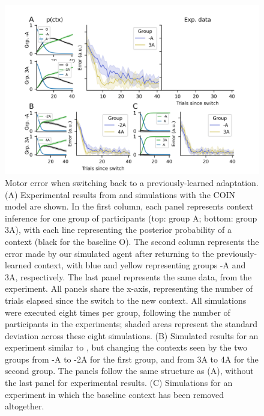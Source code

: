 \documentclass[a4paper,doc,floatsintext,natbib]{apa6}%
\begin{document}
\begin{figure}
\centering
\includegraphics{./figures/figure_3.png}
\caption{Motor error when switching back to a previously-learned adaptation. (A) Experimental results from \cite{Davidson_Scaling_2004} and simulations with the COIN model are shown. In the first column, each panel represents context inference for one group of participants (top: group A; bottom: group 3A), with each line representing the posterior probability of a context (black for the baseline O). The second column represents the error made by our simulated agent after returning to the previously-learned context, with blue and yellow representing groups -A and 3A, respectively. The last panel represents the same data, from the \cite{Davidson_Scaling_2004} experiment. All panels share the x-axis, representing the number of trials elapsed since the switch to the new context. All simulations were executed eight times per group, following the number of participants in the experiments; shaded areas represent the standard deviation across these eight simulations. (B) Simulated results for an experiment similar to \cite{Davidson_Scaling_2004}, but changing the contexts seen by the two groups from -A to -2A for the first group, and from 3A to 4A for the second group. The panels follow the same structure as (A), without the last panel for experimental results. (C) Simulations for an experiment in which the baseline context has been removed altogether.}
\label{fig:davidson-2004}
\end{figure}
\end{document}

